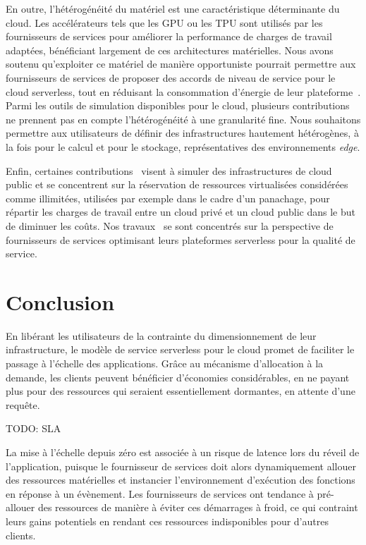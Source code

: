 En outre, l'hétérogénéité du matériel est une caractéristique déterminante du cloud. Les accélérateurs tels que les \gls{GPU} ou les \gls{TPU} sont utilisés par les fournisseurs de services pour améliorer la performance de charges de travail adaptées, bénéficiant largement de ces architectures matérielles. Nous avons soutenu qu'exploiter ce matériel de manière opportuniste pourrait permettre aux fournisseurs de services de proposer des accords de niveau de service pour le cloud serverless, tout en réduisant la consommation d'énergie de leur plateforme~\cite{herofake}.
Parmi les outils de simulation disponibles pour le cloud, plusieurs contributions~\cite{jeonCloudSimExtensionSimulatingDistributed2019, cai_elasticsim_2017, nunez_icancloud_2012, mahmoudiSimFaaSPerformanceSimulator2021} ne prennent pas en compte l'hétérogénéité à une granularité fine. Nous souhaitons permettre aux utilisateurs de définir des infrastructures hautement hétérogènes, à la fois pour le calcul et pour le stockage, représentatives des environnements \textit{edge}.

Enfin, certaines contributions~\cite{nunez_icancloud_2012, mahmoudiSimFaaSPerformanceSimulator2021} visent à simuler des infrastructures de cloud public et se concentrent sur la réservation de ressources virtualisées considérées comme illimitées, utilisées par exemple dans le cadre d'un panachage, pour répartir les charges de travail entre un cloud privé et un cloud public dans le but de diminuer les coûts.
Nos travaux~\cite{herofake, herocache} se sont concentrés sur la perspective de fournisseurs de services optimisant leurs plateformes serverless pour la qualité de service.

\section{Conclusion}

En libérant les utilisateurs de la contrainte du dimensionnement de leur infrastructure, le modèle de service serverless pour le cloud promet de faciliter le passage à l'échelle des applications. Grâce au mécanisme d'allocation à la demande, les clients peuvent bénéficier d'économies considérables, en ne payant plus pour des ressources qui seraient essentiellement dormantes, en attente d'une requête.

TODO: SLA

La mise à l'échelle depuis zéro est associée à un risque de latence lors du réveil de l'application, puisque le fournisseur de services doit alors dynamiquement allouer des ressources matérielles et instancier l'environnement d'exécution des fonctions en réponse à un évènement. Les fournisseurs de services ont tendance à pré-allouer des ressources de manière à éviter ces démarrages à froid, ce qui contraint leurs gains potentiels en rendant ces ressources indisponibles pour d'autres clients.

